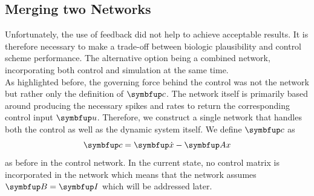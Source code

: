 \subsection{Merging two Networks}
Unfortunately, the use of feedback did not help to achieve acceptable results. It is therefore necessary to make a trade-off between biologic plausibility and control scheme performance. The alternative option being a combined network, incorporating both control and simulation at the same time.\\
As highlighted before, the governing force behind the control was not the network but rather only the definition of $\bmu{c}$. The network itself is primarily based around producing the necessary spikes and rates to return the corresponding control input $\bmu{u}$. Therefore, we construct a single network that handles both the control as well as the dynamic system itself. We define $\bmu{c}$ as
\begin{equation}
	\bmu{c} =  \bmu{\dot{x}}-\bmu{Ax}
\end{equation}
as before in the control network. In the current state, no control matrix is incorporated in the network which means that the network assumes $\bmu{B} = \bmu{I}$ which will be addressed later.

